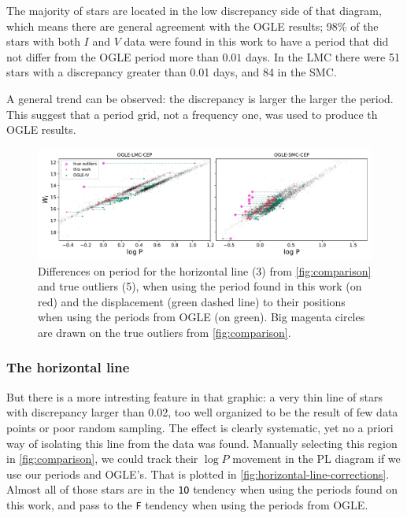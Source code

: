 The majority of stars are located in the low discrepancy side of that diagram, which means there are general agreement with the OGLE results;
98\% of the stars with both $I$ and $V$ data were found in this work to have a period that did not differ from the OGLE period more than $0.01$ days.
In the LMC there were 51 stars with a discrepancy greater than 0.01 days, and 84 in the SMC.

A general trend can be observed: the discrepancy is larger the larger the period.
This suggest that a period grid, not a frequency one, was used to produce th OGLE results.

\begin{figure}
	\centering
	\includegraphics[width=\textwidth]{img/horizontal_line_corrections.pdf}
	\caption[Results: comparison with OGLE-IV periods]{
		Differences on period for the horizontal line (3) from \autoref{fig:comparison} and true outliers (5), when using the period found in this work (on red)
		and the displacement  (green dashed line) to their positions when using the periods from OGLE (on green).
		Big magenta circles are drawn on the true outliers from  \autoref{fig:comparison}.
	}
	\label{fig:horizontal-line-corrections}
\end{figure}

\subsubsection{The horizontal line}

But there is a more intresting feature in that graphic: a very thin line of stars with discrepancy larger than 0.02, 
too well organized to be the result of few data points or poor random sampling.
The effect is clearly systematic, yet no a priori way of isolating this line from the data was found.
Manually selecting this region in \autoref{fig:comparison}, 
we could track their $\log P$ movement in the PL diagram if we use our periods and OGLE's.
That is plotted in \autoref{fig:horizontal-line-corrections}.
Almost all of those stars are in the \texttt{1O} tendency when using the periods found on this work,
and pass to the \texttt{F} tendency when using the periods from OGLE. 

